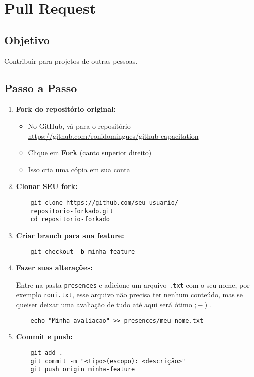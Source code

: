 \section{Pull Request}

\subsection{Objetivo}
Contribuir para projetos de outras pessoas.

\subsection{Passo a Passo}
\begin{enumerate}
    \item \textbf{Fork do repositório original:}
    \begin{itemize}
        \item No GitHub, vá para o repositório \url{https://github.com/ronidomingues/github-capacitation}
        \item Clique em \textbf{Fork} (canto superior direito)
        \item Isso cria uma cópia em sua conta
    \end{itemize}
    
    \item \textbf{Clonar SEU fork:}
    \begin{verbatim}
    git clone https://github.com/seu-usuario/
    repositorio-forkado.git
    cd repositorio-forkado
    \end{verbatim}
    
    \item \textbf{Criar branch para sua feature:}
    \begin{verbatim}
    git checkout -b minha-feature
    \end{verbatim}
    
    \item \textbf{Fazer suas alterações:}
    \par Entre na pasta \texttt{presences} e adicione um arquivo \texttt{.txt} com o seu nome, por exemplo \texttt{roni.txt}, esse arquivo não precisa ter nenhum conteúdo, mas se queiser deixar uma avaliação de tudo até aqui será ótimo $\left. ;- \right)$.
    \begin{verbatim}
    echo "Minha avaliacao" >> presences/meu-nome.txt
    \end{verbatim}
    
    \item \textbf{Commit e push:}
    \begin{verbatim}
    git add .
    git commit -m "<tipo>(escopo): <descrição>"
    git push origin minha-feature
    \end{verbatim}
    

\end{enumerate}
